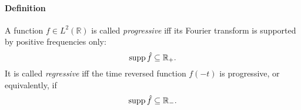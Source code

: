 \documentclass[12pt]{article}
\begin{document}
\newcommand{\supp}{\ensuremath{\mathop{\rm supp}}}
\newcommand{\R}{\ensuremath{\mathbb R}}

\paragraph{Definition}
A function $f \in L^2(\R)$ is called \emph{progressive} iff its Fourier transform is supported by positive frequencies only:
$$\supp \hat{f} \subseteq \R_+.$$
It is called \emph{regressive} iff the time reversed function $f(-t)$ is progressive, or equivalently, if 
$$\supp \hat{f} \subseteq \R_-.$$
\end{document}
